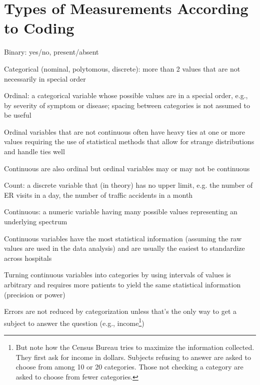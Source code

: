 \section{Types of Measurements According to Coding}  \label{sec:overview-coding}
\bi
 \item Binary: yes/no, present/absent
 \item Categorical (nominal, polytomous, discrete): more than 2 values
   that are not necessarily in special order
 \item Ordinal: a categorical variable whose possible values are in a
   special order, e.g., by severity of symptom or disease; spacing
   between categories is not assumed to be useful
  \bi
  \item Ordinal variables that are not continuous often have heavy
    ties at one or more values requiring the use of statistical
    methods that allow for strange distributions and handle ties well
  \item Continuous are also ordinal but ordinal variables may or may
    not be continuous
  \ei
 \item Count: a discrete variable that (in theory) has no upper limit, e.g. the number of ER visits in a day, the number of traffic accidents in a month
 \item Continuous: a numeric variable having many possible values
   representing an underlying spectrum
 \item Continuous variables have the most statistical information
  (assuming the raw values are used in the data analysis) and
  are usually the easiest to standardize across hospitals
 \item Turning continuous variables
  into categories by using intervals of values is arbitrary and
  requires more patients to yield the same statistical information
  (precision or power)
 \item Errors are not reduced by categorization unless that's the only
   way to get a subject to answer the question (e.g.,
 income\footnote{But note how the Census Bureau tries to maximize the
 information collected.  They first ask for income in
 dollars.  Subjects refusing to answer are asked to choose from among
 10 or 20 categories.  Those not checking a category are asked to
 choose from fewer categories.})
\ei

